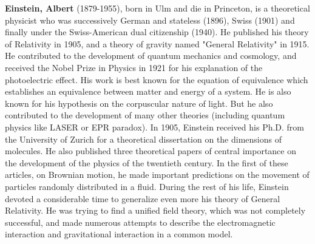 \textbf{Einstein, Albert} (1879-1955), born in Ulm and die in Princeton, is a theoretical physicist who was successively German and stateless (1896), Swiss (1901) and finally under the Swiss-American dual citizenship (1940). He published his theory of Relativity in 1905, and a theory of gravity named "General Relativity" in 1915. He contributed to the development of quantum mechanics and cosmology, and received the Nobel Prize in Physics in 1921 for his explanation of the photoelectric effect. His work is best known for the equation of equivalence which establishes an equivalence between matter and energy of a system. He is also known for his hypothesis on the corpuscular nature of light. But he also contributed to the development of many other theories (including quantum physics like LASER or EPR paradox). In 1905, Einstein received his Ph.D. from the University of Zurich for a theoretical dissertation on the dimensions of molecules. He also published three theoretical papers of central importance on the development of the physics of the twentieth century. In the first of these articles, on Brownian motion, he made important predictions on the movement of particles randomly distributed in a fluid. During the rest of his life, Einstein devoted a considerable time to generalize even more his theory of General Relativity. He was trying to find a unified field theory, which was not completely successful, and made numerous attempts to describe the electromagnetic interaction and gravitational interaction in a common model.

